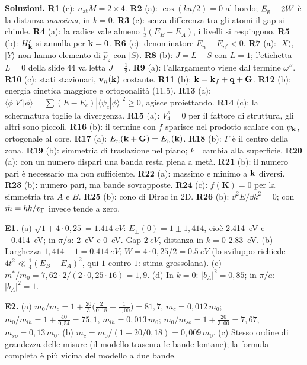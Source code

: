 \documentclass[11pt,a4paper]{article}
\begin{document}
\textbf{Soluzioni.}
\begingroup\small
\textbf{R1} (c): $n_{\mathrm{at}}M=2\times4$. \textbf{R2} (a): $\cos(ka/2)=0$ al bordo; $E_{\mathrm g}+2W$ è la distanza \emph{massima}, in $k=0$. \textbf{R3} (c):
senza differenza tra gli atomi il gap si chiude. \textbf{R4} (a): la radice vale almeno $\frac12(E_B-E_A)$, i livelli si respingono. \textbf{R5} (b):
$H'_{\mathbf k}$ si annulla per $\mathbf k=0$. \textbf{R6} (c): denominatore $E_n-E_{n'}<0$. \textbf{R7} (a): $|X\rangle$, $|Y\rangle$ non hanno elemento di
$\hat p_z$ con $|S\rangle$. \textbf{R8} (b): $J=L-S$ con $L=1$; l'etichetta $L=0$ della slide 44 va letta $J=\frac12$. \textbf{R9} (a): l'allargamento
viene dal termine $\omega''$. \textbf{R10} (c): stati stazionari, $\mathbf v_n(\mathbf k)$ costante. \textbf{R11} (b): $\mathbf k=\mathbf k_f+\mathbf q+\mathbf G$. \textbf{R12} (b): energia cinetica
maggiore e ortogonalità (11.5). \textbf{R13} (a): $\langle\phi|V'|\phi\rangle=\sum(E-E_c)|\langle\psi_c|\phi\rangle|^2\ge0$, agisce proiettando.
\textbf{R14} (c): la schermatura toglie la divergenza. \textbf{R15} (a): $V^s_4=0$ per il fattore di struttura, gli altri sono piccoli. \textbf{R16} (b):
il termine con $f$ sparisce nel prodotto scalare con $\psi_{\mathbf k}$, ortogonale al core. \textbf{R17} (a): $E_n(\mathbf k+\mathbf G)=E_n(\mathbf k)$. \textbf{R18} (b):
$\Gamma$ è il centro della zona. \textbf{R19} (b): simmetria di traslazione nel piano; $k_\perp$ cambia alla superficie. \textbf{R20} (a): con un
numero dispari una banda resta piena a metà. \textbf{R21} (b): il numero pari è necessario ma non sufficiente. \textbf{R22} (a): massimo e minimo a
$\mathbf k$ diversi. \textbf{R23} (b): numero pari, ma bande sovrapposte. \textbf{R24} (c): $f(\mathbf K)=0$ per la simmetria tra $A$ e $B$.
\textbf{R25} (b): cono di Dirac in 2D. \textbf{R26} (b): $\dd^2E/\dd k^2=0$; con $\tilde m=\hbar k/v_{\mathrm F}$ invece tende a zero.

\smallskip\noindent\textbf{E1.} (a) $\sqrt{1+4\cdot0{,}25}=\SI{1.414}{eV}$: $E_\pm(0)=1\pm1{,}414$, cioè \SI{2.414}{eV} e \SI{-0.414}{eV}; in $\pi/a$:
\SI{2}{eV} e \SI{0}{eV}. Gap $\SI{2}{eV}$, distanza in $k=0$ \SI{2.83}{eV}. (b) Larghezza $1{,}414-1=\SI{0.414}{eV}$; $W=4\cdot0{,}25/2=\SI{0.5}{eV}$
(lo sviluppo richiede $4t^2\ll\frac14(E_B-E_A)^2$, qui $1$ contro $1$: stima grossolana). (c) $m^*/m_0=7{,}62\cdot2/(2\cdot0{,}25\cdot16)=1{,}9$.
(d) In $k=0$: $|b_A|^2=0{,}85$; in $\pi/a$: $|b_A|^2=1$.

\smallskip\noindent\textbf{E2.} (a) $m_0/m_c=1+\frac{20}3\bigl(\frac2{0{,}18}+\frac1{1{,}00}\bigr)=81{,}7$, $m_c=0{,}012\,m_0$;
$m_0/m_{lh}=1+\frac{40}{0{,}54}=75{,}1$, $m_{lh}=0{,}013\,m_0$; $m_0/m_{so}=1+\frac{20}{3{,}00}=7{,}67$, $m_{so}=0{,}13\,m_0$. (b) $m_c=m_0/(1+20/0{,}18)
=0{,}009\,m_0$. (c) Stesso ordine di grandezza delle misure (il modello trascura le bande lontane); la formula completa è più vicina del modello a due
bande.
\end{document}
